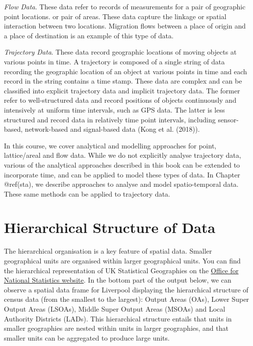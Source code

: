 \documentclass[
  letterpaper,
  DIV=11,
  numbers=noendperiod]{scrreprt}
\begin{document}
\emph{Flow Data}. These data refer to records of measurements for a pair
of geographic point locations. or pair of areas. These data capture the
linkage or spatial interaction between two locations. Migration flows
between a place of origin and a place of destination is an example of
this type of data.

\emph{Trajectory Data}. These data record geographic locations of moving
objects at various points in time. A trajectory is composed of a single
string of data recording the geographic location of an object at various
points in time and each record in the string contains a time stamp.
These data are complex and can be classified into explicit trajectory
data and implicit trajectory data. The former refer to well-structured
data and record positions of objects continuously and intensively at
uniform time intervals, such as GPS data. The latter is less structured
and record data in relatively time point intervals, including
sensor-based, network-based and signal-based data (Kong et al. (2018)).

In this course, we cover analytical and modelling approaches for point,
lattice/areal and flow data. While we do not explicitly analyse
trajectory data, various of the analytical approaches described in this
book can be extended to incorporate time, and can be applied to model
these types of data. In Chapter @ref(sta), we describe approaches to
analyse and model spatio-temporal data. These same methods can be
applied to trajectory data.

\hypertarget{hierarchical-structure-of-data}{%
\section{Hierarchical Structure of
Data}\label{hierarchical-structure-of-data}}

The hierarchical organisation is a key feature of spatial data. Smaller
geographical units are organised within larger geographical units. You
can find the hierarchical representation of UK Statistical Geographies
on the
\href{https://geoportal.statistics.gov.uk/search?collection=Document\&sort=name\&tags=all(DOC_HRSG\%2CDEC_2020)}{Office
for National Statistics website}. In the bottom part of the output
below, we can observe a spatial data frame for Liverpool displaying the
hierarchical structure of census data (from the smallest to the
largest): Output Areas (OAs), Lower Super Output Areas (LSOAs), Middle
Super Output Areas (MSOAs) and Local Authority Districts (LADs). This
hierarchical structure entails that units in smaller geographies are
nested within units in larger geographies, and that smaller units can be
aggregated to produce large units.
\end{document}
